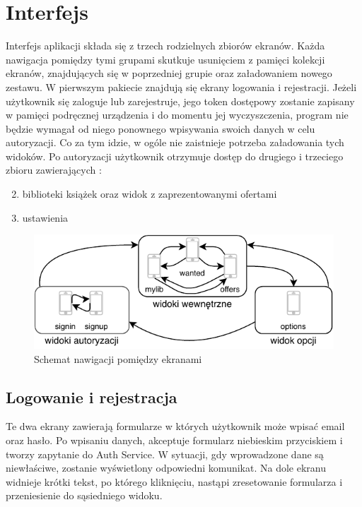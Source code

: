 \chapter{Interfejs}
\label{cha:interfejs}

Interfejs aplikacji składa się z trzech rodzielnych zbiorów ekranów. Każda nawigacja pomiędzy tymi grupami skutkuje usunięciem z pamięci kolekcji ekranów, znajdujących się w poprzedniej grupie oraz załadowaniem nowego zestawu.
W pierwszym pakiecie znajdują się ekrany logowania i rejestracji. Jeżeli użytkownik się zaloguje lub zarejestruje, jego token dostępowy zostanie zapisany w pamięci podręcznej urządzenia i do momentu jej wyczyszczenia, program nie będzie wymagał od niego ponownego wpisywania swoich danych w celu autoryzacji. Co za tym idzie, w ogóle nie zaistnieje potrzeba załadowania tych widoków.
Po autoryzacji użytkownik otrzymuje dostęp do drugiego i trzeciego zbioru zawierających :
\begin{enumerate}
    \setcounter{enumi}{1}
    \item biblioteki książek oraz widok z zaprezentowanymi ofertami
    \item ustawienia
\end{enumerate} 

\begin{figure}[H]
	\centering
	\includegraphics[width=\linewidth]{navig.pdf}
	\caption{Schemat nawigacji pomiędzy ekranami}
\end{figure}

\section{Logowanie i rejestracja}
Te dwa ekrany zawierają formularze w których użytkownik może wpisać email oraz hasło. Po wpisaniu danych, akceptuje formularz niebieskim przyciskiem i tworzy zapytanie do Auth Service. W sytuacji, gdy wprowadzone dane są niewłaściwe, zostanie wyświetlony odpowiedni komunikat.
Na dole ekranu widnieje krótki tekst, po którego kliknięciu, nastąpi zresetowanie formularza i przeniesienie do sąsiedniego widoku.

